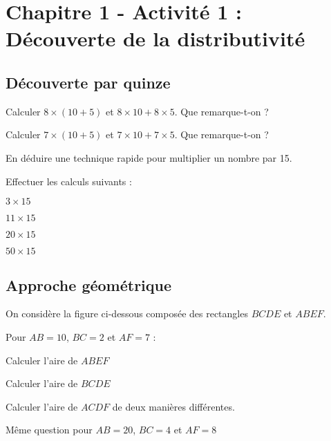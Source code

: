 \section*{Chapitre 1 - Activité 1 : Découverte de la distributivité}

\subsection*{Découverte par quinze}

\cnt Calculer $8\times (10+5)$ et $8\times 10 + 8 \times 5$. Que remarque-t-on ?

\cnt Calculer $7\times (10+5)$ et $7\times 10 + 7 \times 5$. Que remarque-t-on ?

\cnt En déduire une technique rapide pour multiplier un nombre par 15.

\cnt Effectuer les calculs suivants :

\begin{multicols}{4}
    $3\times 15$

    $11\times 15$

    $20\times 15$

    $50\times 15$
\end{multicols}

\subsection*{Approche géométrique}

On considère la figure ci-dessous composée des rectangles $BCDE$ et $ABEF$.



\begin{minipage}[m]{0.35\textwidth}
    \begin{figure}[H]
        \centering
    \end{figure}
\end{minipage}
\hfill
\begin{minipage}[m]{0.6\textwidth}
    Pour $AB=10$, $BC=2$ et $AF=7$ :
    
    \cnt Calculer l'aire de $ABEF$
    
    \cnt Calculer l'aire de $BCDE$
    
    \cnt Calculer l'aire de $ACDF$ de deux manières différentes.
    
    \cnt Même question pour $AB=20$, $BC=4$ et $AF=8$
\end{minipage}

